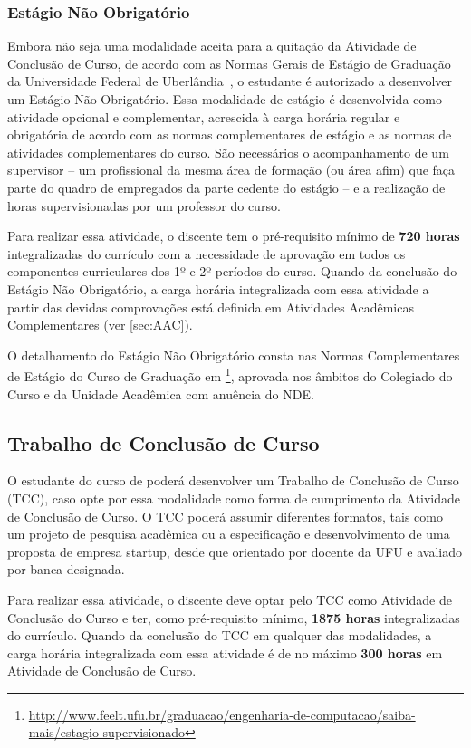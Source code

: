 \subsubsection{Estágio Não Obrigatório}

Embora não seja uma modalidade aceita para a quitação da Atividade de Conclusão de Curso, de acordo com as Normas Gerais de Estágio de Graduação da Universidade Federal de Uberlândia~\cite{ufu_congrad_93_2023}, o estudante é autorizado a desenvolver um Estágio Não Obrigatório. Essa modalidade de estágio é desenvolvida como atividade opcional e complementar, acrescida à carga horária regular e obrigatória de acordo com as normas complementares de estágio e as normas de atividades complementares do curso. São necessários o acompanhamento de um supervisor -- um profissional da mesma área de formação (ou área afim) que faça parte do quadro de empregados da parte cedente do estágio -- e a realização de horas supervisionadas por um professor do curso.

Para realizar essa atividade, o discente tem o pré-requisito mínimo de \textbf{720 horas} integralizadas do currículo com a necessidade de aprovação em todos os componentes curriculares dos 1º e 2º períodos do curso. Quando da conclusão do Estágio Não Obrigatório, a carga horária integralizada com essa atividade a partir das devidas comprovações está definida em Atividades Acadêmicas Complementares (ver \autoref{sec:AAC}).

O detalhamento do Estágio Não Obrigatório consta nas Normas Complementares de Estágio do Curso de Graduação em \ppccurso\footnote{\url{http://www.feelt.ufu.br/graduacao/engenharia-de-computacao/saiba-mais/estagio-supervisionado}}, aprovada nos âmbitos do Colegiado do Curso e da Unidade Acadêmica com anuência do NDE.

\subsection{Trabalho de Conclusão de Curso}

O estudante do curso de \ppccurso poderá desenvolver um Trabalho de Conclusão de Curso (TCC), caso opte por essa modalidade como forma de cumprimento da Atividade de Conclusão de Curso. O TCC poderá assumir diferentes formatos, tais como um projeto de pesquisa acadêmica ou a especificação e desenvolvimento de uma proposta de empresa startup, desde que orientado por docente da UFU e avaliado por banca designada.

Para realizar essa atividade, o discente deve optar pelo TCC como Atividade de Conclusão do Curso e ter, como pré-requisito mínimo, \textbf{1875 horas} integralizadas do currículo. Quando da conclusão do TCC em qualquer das modalidades, a carga horária integralizada com essa atividade é de no máximo \textbf{300 horas} em Atividade de Conclusão de Curso.

